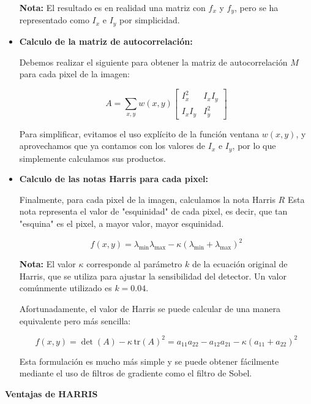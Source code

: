 \documentclass[a4paper]{article}
\begin{document}
\begin{itemize}
        \textbf{Nota:} El resultado es en realidad una matriz con \(f_x\) y \(f_y\), pero se ha representado como \(I_x\) e \(I_y\) por simplicidad.

      
      \item \textbf{Calculo de la matriz de autocorrelación:}  
      
      Debemos realizar el siguiente para obtener la matriz de autocorrelación \(M\) para cada pixel de la imagen:

            \[
        A = \sum_{x, y} w(x, y)
        \begin{bmatrix}
        I_x^2 & I_x I_y \\
        I_x I_y & I_y^2
        \end{bmatrix}
        \]

        Para simplificar, evitamos el uso explícito de la función ventana \(w(x, y)\), y aprovechamos que ya contamos con los valores de \(I_x\) e \(I_y\), por lo que simplemente calculamos sus productos.

        \item \textbf{Calculo de las notas Harris para cada pixel:} 
    
        Finalmente, para cada pixel de la imagen, calculamos la nota Harris \(R\) Esta nota representa
        el valor de "esquinidad" de cada pixel, es decir, que tan "esquina" es el pixel, a mayor valor, mayor esquinidad.

        \[
        f(x, y) = \lambda_{\text{min}} \lambda_{\text{max}} - \kappa (\lambda_{\text{min}} + \lambda_{\text{max}})^2
        \]

        \textbf{Nota:} El valor \(\kappa\) corresponde al parámetro \(k\) de la ecuación original de Harris, que se utiliza para ajustar la sensibilidad del detector. Un valor comúnmente utilizado es \(k = 0.04\).

        Afortunadamente, el valor de Harris se puede calcular de una manera equivalente pero más sencilla:

        \[
        f(x, y) = \det(A) - \kappa \, \text{tr}(A)^2 = a_{11} a_{22} - a_{12} a_{21} - \kappa (a_{11} + a_{22})^2
        \]

    Esta formulación es mucho más simple y se puede obtener fácilmente mediante el uso de filtros de gradiente como el filtro de Sobel.

  \end{itemize}

  \par\vspace{0.5cm}
  \textbf{Ventajas de HARRIS}
  \par\vspace{0.5cm}
  
\end{document}
